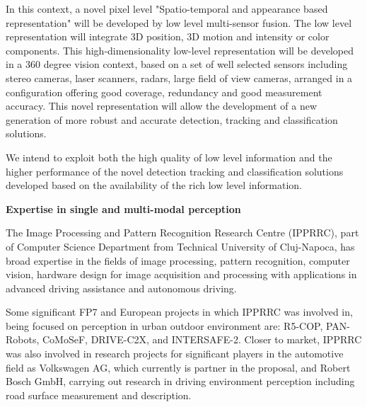 In this context, a novel pixel level "Spatio-temporal and appearance based representation" will be developed by low level multi-sensor fusion. The low level representation will integrate 3D position, 3D motion and intensity or color components. This high-dimensionality low-level representation will be developed in a 360 degree vision context, based on a set of well selected sensors including stereo cameras, laser scanners, radars, large field of view cameras, arranged in a configuration offering good coverage, redundancy and good measurement accuracy. This novel representation will allow the development of a new generation of more robust and accurate detection, tracking and classification solutions. 

We intend to exploit both the high quality of low level information and the higher performance of the novel detection tracking and classification solutions developed based on the availability of the rich low level information.



{\bf Expertise in single and multi-modal perception}
 
The Image Processing and Pattern Recognition Research Centre (IPPRRC), part of Computer Science Department from Technical University of Cluj-Napoca, has broad expertise in the fields of image processing, pattern recognition, computer vision, hardware design for image acquisition and processing with applications in advanced driving assistance and autonomous driving. 

Some significant FP7 and European projects in which IPPRRC was involved in, being focused on perception in urban outdoor environment are: R5-COP, PAN-Robots, CoMoSeF, DRIVE-C2X, and INTERSAFE-2. Closer to market, IPPRRC was also involved in research projects for significant players in the automotive field as Volkswagen AG, which currently is partner in the proposal, and Robert Bosch GmbH, carrying out research in driving environment perception including road surface measurement and description.

